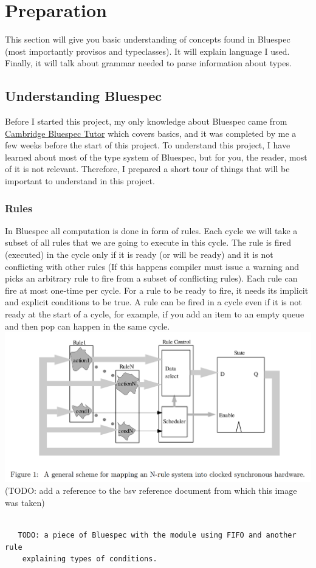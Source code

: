 \documentclass[12pt]{report}
\begin{document}
\chapter{Preparation}
This section will give you basic understanding of concepts found in Bluespec (most importantly provisos and typeclasses). It will explain language I used. Finally, it will talk about grammar needed to parse information about types.
\section{Understanding Bluespec}
Before I started this project, my only knowledge about Bluespec came from \href{https://www-bluespec.cl.cam.ac.uk/}{Cambridge Bluespec Tutor} which covers basics, and it was completed by me a few weeks before the start of this project. To understand this project, I have learned about most of the type system of Bluespec, but for you, the reader, most of it is not relevant. Therefore, I prepared a short tour of things that will be important to understand in this project. 
\subsection{Rules}
In Bluespec all computation is done in form of rules.  
Each cycle we will take a subset of all rules that we are going to execute in this cycle. The rule is fired (executed) in the cycle only if it is ready (or will be ready) and it is not conflicting with other rules (If this happens compiler must issue a warning and picks an arbitrary rule to fire from a subset of conflicting rules). Each rule can fire at most one-time per cycle.  
For a rule to be ready to fire, it needs its implicit and explicit conditions to be true.  
A rule can be fired in a cycle even if it is not ready at the start of a cycle, for example, if you add an item to an empty queue and then pop can happen in the same cycle. \\ 
\includegraphics[width=\textwidth]{Rulemapping.png} 
(TODO: add a reference to the bsv reference document from which this image was taken) 
\begin{verbatim} 
        
   TODO: a piece of Bluespec with the module using FIFO and another rule 
    explaining types of conditions. 
    
\end{verbatim} 
\end{document}
